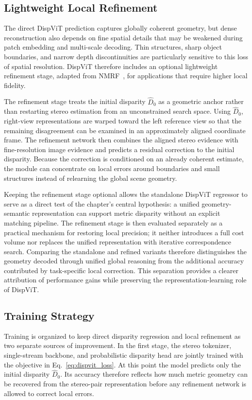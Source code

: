 \subsection{Lightweight Local Refinement}
The direct DispViT prediction captures globally coherent geometry, but dense reconstruction also depends on fine spatial details that may be weakened during patch embedding and multi-scale decoding.
Thin structures, sharp object boundaries, and narrow depth discontinuities are particularly sensitive to this loss of spatial resolution.
DispViT therefore includes an optional lightweight refinement stage, adapted from NMRF~\cite{guan2024neural}, for applications that require higher local fidelity.

The refinement stage treats the initial disparity $\hat{D}_0$ as a geometric anchor rather than restarting stereo estimation from an unconstrained search space.
Using $\hat{D}_0$, right-view representations are warped toward the left reference view so that the remaining disagreement can be examined in an approximately aligned coordinate frame.
The refinement network then combines the aligned stereo evidence with fine-resolution image evidence and predicts a residual correction to the initial disparity.
Because the correction is conditioned on an already coherent estimate, the module can concentrate on local errors around boundaries and small structures instead of relearning the global scene geometry.

Keeping the refinement stage optional allows the standalone DispViT regressor to serve as a direct test of the chapter's central hypothesis: a unified geometry-semantic representation can support metric disparity without an explicit matching pipeline.
The refinement stage is then evaluated separately as a practical mechanism for restoring local precision; it neither introduces a full cost volume nor replaces the unified representation with iterative correspondence search.
Comparing the standalone and refined variants therefore distinguishes the geometry decoded through unified global reasoning from the additional accuracy contributed by task-specific local correction.
This separation provides a clearer attribution of performance gains while preserving the representation-learning role of DispViT.

\subsection{Training Strategy}
Training is organized to keep direct disparity regression and local refinement as two separate sources of improvement.
In the first stage, the stereo tokenizer, single-stream backbone, and probabilistic disparity head are jointly trained with the objective in Eq.~\ref{eq:dispvit_loss}.
At this point the model predicts only the initial disparity $\hat{D}_0$.
Its accuracy therefore reflects how much metric geometry can be recovered from the stereo-pair representation before any refinement network is allowed to correct local errors.

